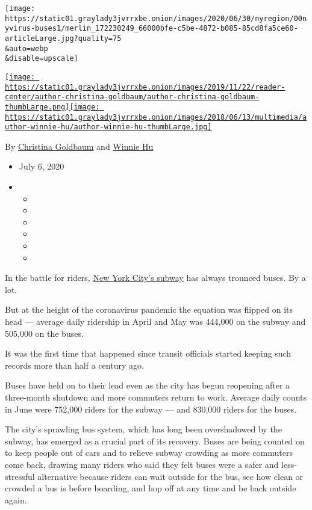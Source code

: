 \texttt{[image: https://static01.graylady3jvrrxbe.onion/images/2020/06/30/nyregion/00nyvirus-buses1/merlin\_172230249\_66000bfe-c5be-4872-b085-85cd8fa5ce60-articleLarge.jpg?quality=75\\\&auto=webp\\\&disable=upscale]}

\href{https://www.nytimes3xbfgragh.onion/by/christina-goldbaum}{\texttt{[image: https://static01.graylady3jvrrxbe.onion/images/2019/11/22/reader-center/author-christina-goldbaum/author-christina-goldbaum-thumbLarge.png]}}\href{https://www.nytimes3xbfgragh.onion/by/winnie-hu}{\texttt{[image: https://static01.graylady3jvrrxbe.onion/images/2018/06/13/multimedia/author-winnie-hu/author-winnie-hu-thumbLarge.jpg]}}

By
\href{https://www.nytimes3xbfgragh.onion/by/christina-goldbaum}{Christina
Goldbaum} and
\href{https://www.nytimes3xbfgragh.onion/by/winnie-hu}{Winnie Hu}

\begin{itemize}
\item
  July 6, 2020
\item
  \begin{itemize}
  \item
  \item
  \item
  \item
  \item
  \item
  \end{itemize}
\end{itemize}

In the battle for riders,
\href{https://www.nytimes3xbfgragh.onion/2020/07/21/nyregion/mta-subway-financial-cuts.html}{New
York City's subway} has always trounced buses. By a lot.

But at the height of the coronavirus pandemic the equation was flipped
on its head --- average daily ridership in April and May was 444,000 on
the subway and 505,000 on the buses.

It was the first time that happened since transit officials started
keeping such records more than half a century ago.

Buses have held on to their lead even as the city has begun reopening
after a three-month shutdown and more commuters return to work. Average
daily counts in June were 752,000 riders for the subway --- and 830,000
riders for the buses.

The city's sprawling bus system, which has long been overshadowed by the
subway, has emerged as a crucial part of its recovery. Buses are being
counted on to keep people out of cars and to relieve subway crowding as
more commuters come back, drawing many riders who said they felt buses
were a safer and less-stressful alternative because riders can wait
outside for the bus, see how clean or crowded a bus is before boarding,
and hop off at any time and be back outside again.

